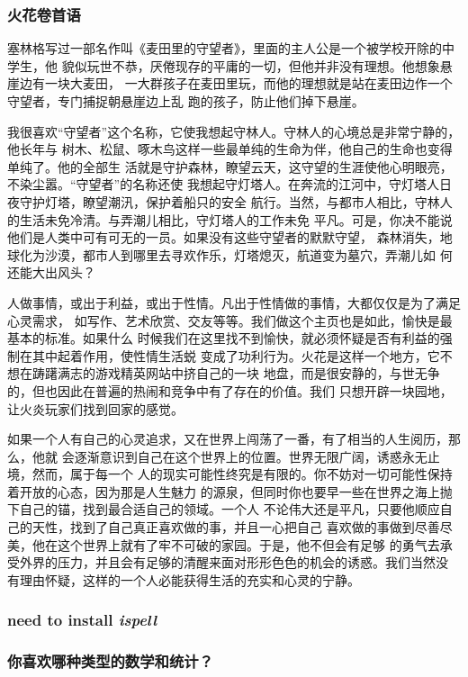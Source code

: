 \documentclass[11pt]{article}
\begin{document}
\subsubsection*{火花卷首语}
\label{sec:orgheadline73}

塞林格写过一部名作叫《麦田里的守望者》，里面的主人公是一个被学校开除的中学生，他
貌似玩世不恭，厌倦现存的平庸的一切，但他并非没有理想。他想象悬崖边有一块大麦田，
一大群孩子在麦田里玩，而他的理想就是站在麦田边作一个守望者，专门捕捉朝悬崖边上乱
跑的孩子，防止他们掉下悬崖。

我很喜欢“守望者”这个名称，它使我想起守林人。守林人的心境总是非常宁静的，他长年与
树木、松鼠、啄木鸟这样一些最单纯的生命为伴，他自己的生命也变得单纯了。他的全部生
活就是守护森林，瞭望云天，这守望的生涯使他心明眼亮，不染尘嚣。“守望者”的名称还使
我想起守灯塔人。在奔流的江河中，守灯塔人日夜守护灯塔，瞭望潮汛，保护着船只的安全
航行。当然，与都市人相比，守林人的生活未免冷清。与弄潮儿相比，守灯塔人的工作未免
平凡。可是，你决不能说他们是人类中可有可无的一员。如果没有这些守望者的默默守望，
森林消失，地球化为沙漠，都市人到哪里去寻欢作乐，灯塔熄灭，航道变为墓穴，弄潮儿如
何还能大出风头？

人做事情，或出于利益，或出于性情。凡出于性情做的事情，大都仅仅是为了满足心灵需求，
如写作、艺术欣赏、交友等等。我们做这个主页也是如此，愉快是最基本的标准。如果什么
时候我们在这里找不到愉快，就必须怀疑是否有利益的强制在其中起着作用，使性情生活蜕
变成了功利行为。火花是这样一个地方，它不想在踌躇满志的游戏精英网站中挤自己的一块
地盘，而是很安静的，与世无争的，但也因此在普遍的热闹和竞争中有了存在的价值。我们
只想开辟一块园地，让火炎玩家们找到回家的感觉。

如果一个人有自己的心灵追求，又在世界上闯荡了一番，有了相当的人生阅历，那么，他就
会逐渐意识到自己在这个世界上的位置。世界无限广阔，诱惑永无止境，然而，属于每一个
人的现实可能性终究是有限的。你不妨对一切可能性保持着开放的心态，因为那是人生魅力
的源泉，但同时你也要早一些在世界之海上抛下自己的锚，找到最合适自己的领域。一个人
不论伟大还是平凡，只要他顺应自己的天性，找到了自己真正喜欢做的事，并且一心把自己
喜欢做的事做到尽善尽美，他在这个世界上就有了牢不可破的家园。于是，他不但会有足够
的勇气去承受外界的压力，并且会有足够的清醒来面对形形色色的机会的诱惑。我们当然没
有理由怀疑，这样的一个人必能获得生活的充实和心灵的宁静。
\subsubsection*{need to install \emph{ispell}}
\label{sec:orgheadline74}

\subsubsection*{\textbf{你喜欢哪种类型的数学和统计？}}
\label{sec:orgheadline75}
\end{document}
